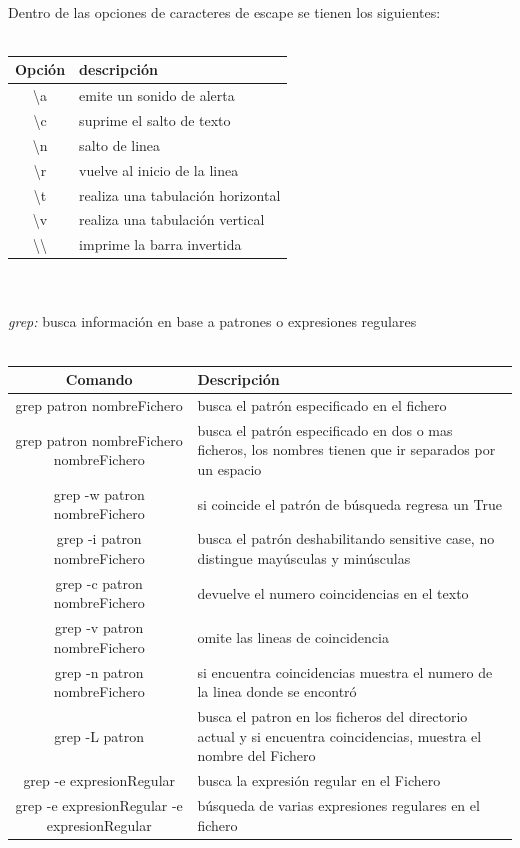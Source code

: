 \documentclass[10pt,a4paper,titlepage]{article}
\begin{document}
	\\
	Dentro de las opciones de caracteres de escape se tienen los siguientes:
	\\
	\\
	\begin{tabular}{|c|p{8cm}|}
		\hline
		Opción & descripción \\
		\hline
		\textbackslash a & emite un sonido de alerta \\
		\hline
		\textbackslash c & suprime el salto de texto \\
		\hline
		\textbackslash n & salto de linea \\
		\hline
		\textbackslash r & vuelve al inicio de la linea \\
		\hline
		\textbackslash t & realiza una tabulación horizontal \\
		\hline
		\textbackslash v & realiza una tabulación vertical \\
		\hline
		\textbackslash \textbackslash & imprime la barra invertida \\
		\hline
	\end{tabular}
	\\
	\\
	\emph{grep:} busca información en base a patrones o expresiones regulares
	\\
	\\
	\begin{tabular}{|c|p{7cm}|}
		\hline
		Comando & Descripción \\
		\hline
		grep patron nombreFichero & busca el patrón especificado en el fichero \\
		\hline
		grep patron nombreFichero nombreFichero & busca el patrón especificado en dos o mas ficheros, los nombres tienen que ir separados por un espacio \\
		\hline
		grep -w patron nombreFichero & si coincide el patrón de búsqueda regresa un True \\
		\hline
		grep -i patron nombreFichero & busca el patrón deshabilitando sensitive case, no distingue mayúsculas y minúsculas \\
		\hline
		grep -c patron nombreFichero & devuelve el numero coincidencias en el texto \\
		\hline
		grep -v patron nombreFichero & omite las lineas de coincidencia \\
		grep -n patron nombreFichero & si encuentra coincidencias muestra el numero de la linea donde se encontró \\
		\hline
		grep -L patron & busca el patron en los ficheros del directorio actual y si encuentra coincidencias, muestra el nombre del Fichero \\
		\hline
		grep -e expresionRegular & busca la expresión regular en el Fichero \\
		\hline
		grep -e expresionRegular -e expresionRegular & búsqueda de varias expresiones regulares en el fichero \\
		\hline
	\end{tabular}
\end{document}
